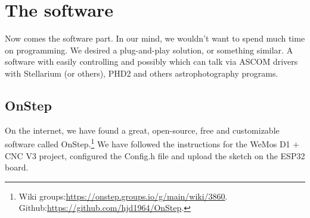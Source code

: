 \section{The software}
Now comes the software part.
In our mind, we wouldn't want to spend much time on programming.
We desired a plug-and-play solution, or something similar.
A software with easily controlling and possibly which can talk via ASCOM drivers with Stellarium (or others), PHD2 and others astrophotography programs.

\subsection{OnStep}
On the internet, we have found a great, open-source, free and customizable software called OnStep.\footnote{Wiki groups:\url{https://onstep.groups.io/g/main/wiki/3860}.\\Github:\url{https://github.com/hjd1964/OnStep}.}
We have followed the instructions for the WeMos D1 \(+\) CNC V3 project, configured the Config.h file and upload the sketch on the ESP32 board.
